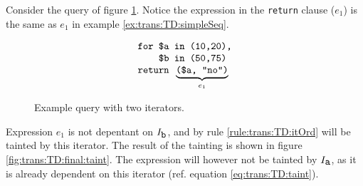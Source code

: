 \begin{myExample}
Consider the query of figure \ref{fig:trans:TD:dblFor}. Notice the expression in the \texttt{return} clause ($e_1$)
is the same as $e_1$ in example \ref{ex:trans:TD:simpleSeq}.

\begin{figure}[h]
\begin{equation*}
\begin{array}{l}
\mbox{\texttt{for \$a in (10,20),}} \\
\mbox{\texttt{\phantom{abcd}\$b in (50,75)}} \\ 
\mbox{\texttt{return }}\underbrace{\mbox{\texttt{(\$a, "no")}} }_{e_{1}}
\end{array}
\end{equation*}
\caption{Example query with two iterators.}
\label{fig:trans:TD:dblFor}
\end{figure}

Expression $e_{1}$ is not depentant on $I_{\mbox{\texttt{b}}}$, and by rule \ref{rule:trans:TD:itOrd} will be
tainted by this iterator. The result of the tainting is shown in figure \ref{fig:trans:TD:final:taint}. The
expression will however not be tainted by $I_{\mbox{\texttt{a}}}$, as it is already dependent on this iterator
(ref. equation \ref{eq:trans:TD:taint}).


\end{myExample}
